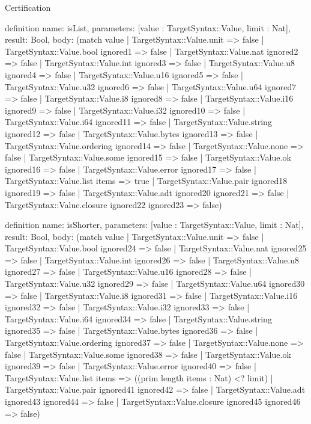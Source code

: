\begin{lexlean}{Certification}
\begin{semanticmodule}
definition{
  name: isList,
  parameters: [value : TargetSyntax::Value, limit : Nat],
  result: Bool,
  body: (match value
    | TargetSyntax::Value.unit => false
    | TargetSyntax::Value.bool ignored1 => false
    | TargetSyntax::Value.nat ignored2 => false
    | TargetSyntax::Value.int ignored3 => false
    | TargetSyntax::Value.u8 ignored4 => false
    | TargetSyntax::Value.u16 ignored5 => false
    | TargetSyntax::Value.u32 ignored6 => false
    | TargetSyntax::Value.u64 ignored7 => false
    | TargetSyntax::Value.i8 ignored8 => false
    | TargetSyntax::Value.i16 ignored9 => false
    | TargetSyntax::Value.i32 ignored10 => false
    | TargetSyntax::Value.i64 ignored11 => false
    | TargetSyntax::Value.string ignored12 => false
    | TargetSyntax::Value.bytes ignored13 => false
    | TargetSyntax::Value.ordering ignored14 => false
    | TargetSyntax::Value.none => false
    | TargetSyntax::Value.some ignored15 => false
    | TargetSyntax::Value.ok ignored16 => false
    | TargetSyntax::Value.error ignored17 => false
    | TargetSyntax::Value.list items => true
    | TargetSyntax::Value.pair ignored18 ignored19 => false
    | TargetSyntax::Value.adt ignored20 ignored21 => false
    | TargetSyntax::Value.closure ignored22 ignored23 => false)
}

definition{
  name: isShorter,
  parameters: [value : TargetSyntax::Value, limit : Nat],
  result: Bool,
  body: (match value
    | TargetSyntax::Value.unit => false
    | TargetSyntax::Value.bool ignored24 => false
    | TargetSyntax::Value.nat ignored25 => false
    | TargetSyntax::Value.int ignored26 => false
    | TargetSyntax::Value.u8 ignored27 => false
    | TargetSyntax::Value.u16 ignored28 => false
    | TargetSyntax::Value.u32 ignored29 => false
    | TargetSyntax::Value.u64 ignored30 => false
    | TargetSyntax::Value.i8 ignored31 => false
    | TargetSyntax::Value.i16 ignored32 => false
    | TargetSyntax::Value.i32 ignored33 => false
    | TargetSyntax::Value.i64 ignored34 => false
    | TargetSyntax::Value.string ignored35 => false
    | TargetSyntax::Value.bytes ignored36 => false
    | TargetSyntax::Value.ordering ignored37 => false
    | TargetSyntax::Value.none => false
    | TargetSyntax::Value.some ignored38 => false
    | TargetSyntax::Value.ok ignored39 => false
    | TargetSyntax::Value.error ignored40 => false
    | TargetSyntax::Value.list items => ((prim length items : Nat) <? limit)
    | TargetSyntax::Value.pair ignored41 ignored42 => false
    | TargetSyntax::Value.adt ignored43 ignored44 => false
    | TargetSyntax::Value.closure ignored45 ignored46 => false)
}


\end{semanticmodule}
\end{lexlean}
